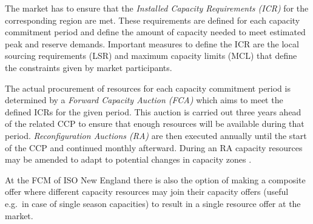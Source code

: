The market has to ensure that the \emph{Installed Capacity Requirements (ICR)} for the corresponding region are met. These requirements are defined for each capacity commitment period and define the amount of capacity needed to meet estimated peak and reserve demands. Important measures to define the ICR are the local sourcing requirements (LSR) and maximum capacity limits (MCL) that define the constraints given by market participants. 

The actual procurement of resources for each capacity commitment period is determined by a \emph{Forward Capacity Auction (FCA)} which aims to meet the defined ICRs for the given period.
This auction is carried out three years ahead of the related CCP to ensure that enough resources will be available during that period. \emph{Reconfiguration Auctions (RA)} are then executed annually until the start of the CCP and continued monthly afterward. During an RA capacity resources may be amended to adapt to potential changes in capacity zones \cite{gottstein2010role}. 

At the FCM of ISO New England there is also the option of making a composite offer where different capacity resources may join their capacity offers (useful e.g.~in case of single season capacities) to result in a single resource offer at the market. 



%
%



